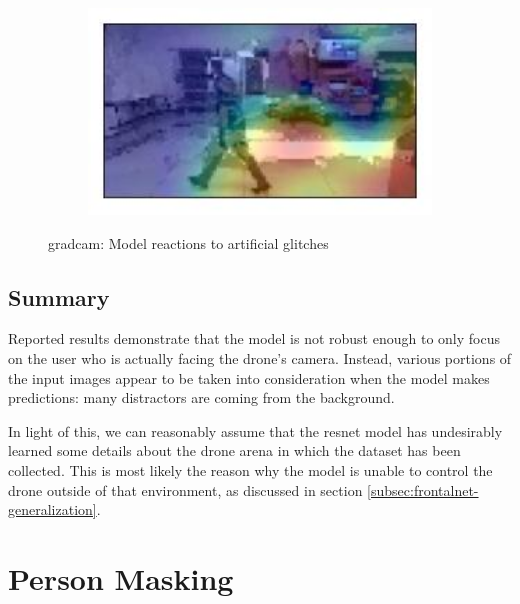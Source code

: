 \begin{figure}[!h]
\begin{center}
\begin{subfigure}[h]{0.24\textwidth}
		\end{subfigure}
		\hfill
		\begin{subfigure}[h]{0.24\textwidth}
			\centering
			\includegraphics[width=1\textwidth]{"contents/images/gradcam/gradcam-glitch-4"}
		\end{subfigure}
	\end{center}
	\vspace{-0.5cm}
	\caption[\gls{gradcam}: Model reactions to artificial glitches]{\gls{gradcam}: Model reactions to artificial glitches}
	\label{fig:gradcam-glitch}
\end{figure}



\subsection{Summary}
\label{subsec:proposed-approach}

Reported results demonstrate that the model is not robust enough to only focus on the user who is actually facing the drone's camera. Instead, various portions of the input images appear to be taken into consideration when the model makes predictions: many distractors are coming from the background.

In light of this, we can reasonably assume that the \gls{resnet} model has undesirably learned some details about the drone arena in which the dataset has been collected. This is most likely the reason why the model is unable to control the drone outside of that environment, as discussed in section \ref{subsec:frontalnet-generalization}.




\section{Person Masking}
\label{sec:masking}

